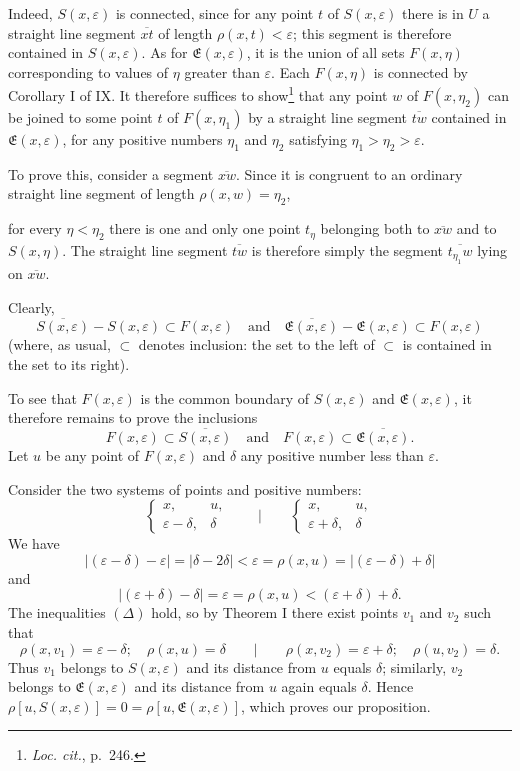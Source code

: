 \documentclass[a4paper,12pt]{amsart}
\newcommand{\srcpage}[1]{} %
\begin{document}
Indeed, $S(x,\varepsilon)$ is connected, since for any point $t$ of $S(x,\varepsilon)$ there is in $U$ a straight line segment $\overline{xt}$ of length $\rho(x,t)<\varepsilon$; this segment is therefore contained in $S(x,\varepsilon)$. As for $\mathfrak{E}(x,\varepsilon)$, it is the union of all sets $F(x,\eta)$ corresponding to values of $\eta$ greater than $\varepsilon$. Each $F(x,\eta)$ is connected by Corollary I of IX. It therefore suffices to show\footnote{\textit{Loc. cit.}, p.~246.} that any point $w$ of $F(x,\eta_2)$ can be joined to some point $t$ of $F(x,\eta_1)$ by a straight line segment $\overline{tw}$ contained in $\mathfrak{E}(x,\varepsilon)$, for any positive numbers $\eta_1$ and $\eta_2$ satisfying $\eta_1>\eta_2>\varepsilon$.

To prove this, consider a segment $\overline{xw}$. Since it is congruent to an ordinary straight line segment of length $\rho(x,w)=\eta_2$,
\srcpage{86}
for every $\eta<\eta_2$ there is one and only one point $t_\eta$ belonging both to $\overline{xw}$ and to $S(x,\eta)$. The straight line segment $\overline{tw}$ is therefore simply the segment $\overline{t_{\eta_1}w}$ lying on $\overline{xw}$.

Clearly,
\[
\overline{S(x,\varepsilon)}-S(x,\varepsilon)\subset F(x,\varepsilon)
\quad\text{and}\quad
\overline{\mathfrak{E}(x,\varepsilon)}-\mathfrak{E}(x,\varepsilon)\subset F(x,\varepsilon)
\]
(where, as usual, $\subset$ denotes inclusion: the set to the left of $\subset$ is contained in the set to its right).

To see that $F(x,\varepsilon)$ is the common boundary of $S(x,\varepsilon)$ and $\mathfrak{E}(x,\varepsilon)$, it therefore remains to prove the inclusions
\[
F(x,\varepsilon)\subset\overline{S(x,\varepsilon)}\quad\text{and}\quad F(x,\varepsilon)\subset\overline{\mathfrak{E}(x,\varepsilon)}.
\]
Let $u$ be any point of $F(x,\varepsilon)$ and $\delta$ any positive number less than $\varepsilon$.

Consider the two systems of points and positive numbers:
\[
\left\{\begin{array}{cc}x,&u,\\\varepsilon-\delta,&\delta\end{array}\right.
\qquad\Big|\qquad
\left\{\begin{array}{cc}x,&u,\\\varepsilon+\delta,&\delta\end{array}\right.
\]
We have
\[|(\varepsilon-\delta)-\varepsilon|=|\delta-2\delta|<\varepsilon=\rho(x,u)=|(\varepsilon-\delta)+\delta|\]
and
\[|(\varepsilon+\delta)-\delta|=\varepsilon=\rho(x,u)<(\varepsilon+\delta)+\delta.\]
The inequalities $(\Delta)$ hold, so by Theorem I there exist points $v_1$ and $v_2$ such that
\[
\rho(x,v_1)=\varepsilon-\delta;\quad\rho(x,u)=\delta
\qquad\Big|\qquad
\rho(x,v_2)=\varepsilon+\delta;\quad\rho(u,v_2)=\delta.
\]
Thus $v_1$ belongs to $S(x,\varepsilon)$ and its distance from $u$ equals $\delta$; similarly, $v_2$ belongs to $\mathfrak{E}(x,\varepsilon)$ and its distance from $u$ again equals $\delta$. Hence $\rho[u,S(x,\varepsilon)]=0=\rho[u,\mathfrak{E}(x,\varepsilon)]$, which proves our proposition.
\end{document}
